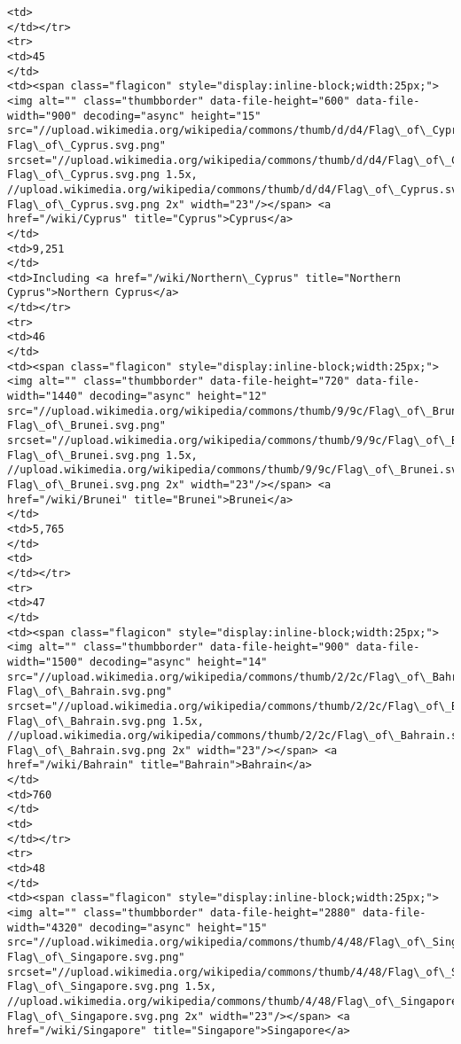 \documentclass[11pt]{article}
\begin{document}
\begin{Verbatim}[commandchars=\\\{\}]
<td>
</td></tr>
<tr>
<td>45
</td>
<td><span class="flagicon" style="display:inline-block;width:25px;"><img alt="" class="thumbborder" data-file-height="600" data-file-width="900" decoding="async" height="15" src="//upload.wikimedia.org/wikipedia/commons/thumb/d/d4/Flag\_of\_Cyprus.svg/23px-Flag\_of\_Cyprus.svg.png" srcset="//upload.wikimedia.org/wikipedia/commons/thumb/d/d4/Flag\_of\_Cyprus.svg/35px-Flag\_of\_Cyprus.svg.png 1.5x, //upload.wikimedia.org/wikipedia/commons/thumb/d/d4/Flag\_of\_Cyprus.svg/45px-Flag\_of\_Cyprus.svg.png 2x" width="23"/></span> <a href="/wiki/Cyprus" title="Cyprus">Cyprus</a>
</td>
<td>9,251
</td>
<td>Including <a href="/wiki/Northern\_Cyprus" title="Northern Cyprus">Northern Cyprus</a>
</td></tr>
<tr>
<td>46
</td>
<td><span class="flagicon" style="display:inline-block;width:25px;"><img alt="" class="thumbborder" data-file-height="720" data-file-width="1440" decoding="async" height="12" src="//upload.wikimedia.org/wikipedia/commons/thumb/9/9c/Flag\_of\_Brunei.svg/23px-Flag\_of\_Brunei.svg.png" srcset="//upload.wikimedia.org/wikipedia/commons/thumb/9/9c/Flag\_of\_Brunei.svg/35px-Flag\_of\_Brunei.svg.png 1.5x, //upload.wikimedia.org/wikipedia/commons/thumb/9/9c/Flag\_of\_Brunei.svg/46px-Flag\_of\_Brunei.svg.png 2x" width="23"/></span> <a href="/wiki/Brunei" title="Brunei">Brunei</a>
</td>
<td>5,765
</td>
<td>
</td></tr>
<tr>
<td>47
</td>
<td><span class="flagicon" style="display:inline-block;width:25px;"><img alt="" class="thumbborder" data-file-height="900" data-file-width="1500" decoding="async" height="14" src="//upload.wikimedia.org/wikipedia/commons/thumb/2/2c/Flag\_of\_Bahrain.svg/23px-Flag\_of\_Bahrain.svg.png" srcset="//upload.wikimedia.org/wikipedia/commons/thumb/2/2c/Flag\_of\_Bahrain.svg/35px-Flag\_of\_Bahrain.svg.png 1.5x, //upload.wikimedia.org/wikipedia/commons/thumb/2/2c/Flag\_of\_Bahrain.svg/46px-Flag\_of\_Bahrain.svg.png 2x" width="23"/></span> <a href="/wiki/Bahrain" title="Bahrain">Bahrain</a>
</td>
<td>760
</td>
<td>
</td></tr>
<tr>
<td>48
</td>
<td><span class="flagicon" style="display:inline-block;width:25px;"><img alt="" class="thumbborder" data-file-height="2880" data-file-width="4320" decoding="async" height="15" src="//upload.wikimedia.org/wikipedia/commons/thumb/4/48/Flag\_of\_Singapore.svg/23px-Flag\_of\_Singapore.svg.png" srcset="//upload.wikimedia.org/wikipedia/commons/thumb/4/48/Flag\_of\_Singapore.svg/35px-Flag\_of\_Singapore.svg.png 1.5x, //upload.wikimedia.org/wikipedia/commons/thumb/4/48/Flag\_of\_Singapore.svg/45px-Flag\_of\_Singapore.svg.png 2x" width="23"/></span> <a href="/wiki/Singapore" title="Singapore">Singapore</a>

\end{Verbatim}
\end{document}
